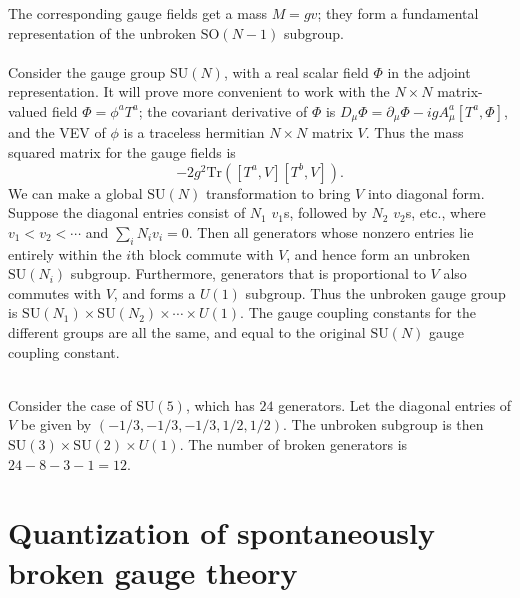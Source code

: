 The corresponding gauge fields get a mass $M = gv$; they form a fundamental representation of the unbroken $\mathrm{SO}(N-1)$ subgroup.
\\ \\
Consider the gauge group $\mathrm{SU}(N)$, with a real scalar field $\Phi$ in the adjoint representation. It will prove more convenient to work with the $N \times N$ matrix-valued field $\Phi = \phi^a T^a$; the covariant derivative of $\Phi$ is $D_{\mu}\Phi = \partial_{\mu}\Phi - igA^a_{\mu}[T^a,\Phi]$,
and the VEV of $\phi$ is a traceless hermitian $N \times N$ matrix $V$. Thus the mass squared matrix for the gauge fields is
\[-2g^2 \mathrm{Tr}\left([T^a,V][T^b,V]\right).\]
We can make a global $\mathrm{SU}(N)$ transformation to bring $V$ into diagonal form. Suppose the diagonal entries consist of $N_1$ $v_1$s, followed by $N_2$ $v_2$s, etc.,
where $v_1 < v_2 < \cdots$ and $\sum_i N_i v_i = 0$. 
Then all generators whose nonzero entries lie entirely within the $i$th block commute with $V$, and hence form an
unbroken $\mathrm{SU}(N_i)$ subgroup. Furthermore, generators that is proportional to $V$ also commutes with $V$, and forms a
$U(1)$ subgroup. Thus the unbroken gauge group is $\mathrm{SU}(N_1)\times \mathrm{SU}(N_2) \times \cdots \times U(1)$. The gauge coupling constants for the different groups are all the same, and equal to the original $\mathrm{SU}(N)$ gauge coupling constant.
\\ \\
\begin{example}
Consider the case of $\mathrm{SU}(5)$, which has $24$ generators. Let the diagonal entries of $V$ be given by $(-{1}/{3},-{1}/{3},-{1}/{3}, {1}/{2}, {1}/{2})$. The unbroken subgroup is then $\mathrm{SU}(3) \times \mathrm{SU}(2) \times U(1)$. The number of broken generators is $24 - 8 - 3 - 1 = 12$.
\end{example}

\section{Quantization of spontaneously broken gauge theory}
